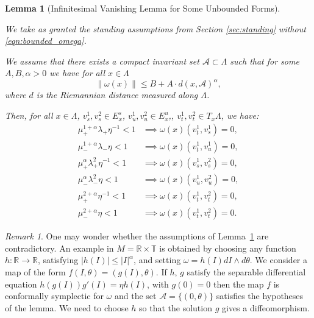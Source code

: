 \documentclass[11pt]{amsart}
\newtheorem{lem}[thm]{Lemma}
\theoremstyle{definition}
\theoremstyle{remark}
\newtheorem{rem}[thm]{Remark}
\numberwithin{equation}{section}
\newcommand{\A}{\mathcal{A}}
\def\torus{{\mathbb T}}
\def\real{{\mathbb R}}
\begin{document}
\begin{lem}[Infinitesimal Vanishing Lemma for Some  Unbounded Forms]\label{prop:unbounded}
  {$ $}

  We take as granted the standing assumptions from Section \ref{sec:standing} without \eqref{eqn:bounded_omega}.


  We  assume that   there exists a compact invariant set $\A \subset \Lambda$ such
  that for some $A,B , \alpha > 0$
    we have for all $x\in\Lambda$
    \begin{equation} \label{form_assumption}
      \| \omega(x) \| \le B+A \cdot d(x,\A)^\alpha ,
    \end{equation}
    where  $d$ is the Riemannian distance measured along $\Lambda$.

Then, for all $x\in\Lambda$, $v^1_s,v^2_s\in E^s_x$, $v^1_u,v^2_u\in E^u_x$,, $v^1_t,v^2_t\in T_x\Lambda$, we have:
\begin{equation}
\label{eqn:vanishing_all}
\begin{split}
\mu_+^{1+\alpha} \lambda_+ \eta^{-1}  < 1 &\implies  \omega(x)(v^1_t,v^1_s)= 0,
\\
\mu_-^{1+\alpha} \lambda_- \eta  < 1 & \implies  \omega(x)(v^1_t,v^1_u)= 0,
\\
\mu_+^\alpha \lambda_+^2\eta^{-1}<1 & \implies  \omega(x)(v^1_s,v^2_s)=0,
\\
\mu_-^\alpha \lambda_-^2 \eta < 1 & \implies  \omega(x)(v^1_u,v^2_u)=0,
\\
\mu_+^{2+\alpha} \eta^{-1}  < 1 &\implies  \omega(x)(v^1_t,v^2_t)= 0,\\
\mu_-^{2+\alpha} \eta   < 1 &\implies  \omega(x)(v^1_t,v^2_t)= 0.
\end{split}
\end{equation}
\end{lem}

\begin{rem}
One may wonder whether the assumptions of  Lemma~\ref{prop:unbounded} are contradictory.
An example in $M = \real \times \torus$ is obtained by choosing any function $h:\real \to \real$, satisfying  $|h(I)|\le |I|^\alpha$, and setting $\omega = h(I) dI \wedge d \theta$.
We consider a map of the form $f(I,\theta) = (g(I), \theta)$.
If  $h$, $g$ satisfy the separable differential equation $h(g(I)) g'(I) =\eta h(I)$, with $g(0)=0$
then the map $f$ is conformally symplectic for $\omega$ and the set $\A=\{ (0,\theta)\}$ satisfies the hypotheses of the lemma.
We need to choose $h$ so that the solution $g$ gives a diffeomorphism.


\end{rem}
\end{document}
